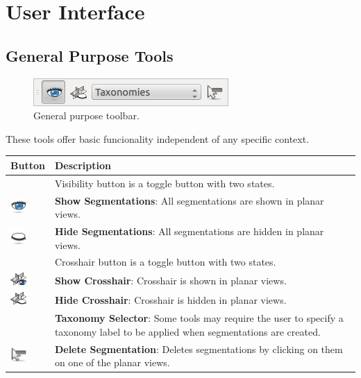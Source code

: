 \section{User Interface}

\subsection{General Purpose Tools}
\begin{figure}[H]
\centering
\includegraphics[scale=0.65]{fig/MainToolbar}
\caption{General purpose toolbar.}
\end{figure}

These tools offer basic funcionality independent of any specific context.\\

\vspace{0.3cm}
\begin{tabular}{| m{1.3cm} | m{12cm} |}
\hline
\textbf{Button} & \textbf{Description}\\
\hline
& Visibility button is a toggle button with two states.\\ 
\includegraphics[width=0.6cm]{../../frontend/rsc/show_all} &
\textbf{Show Segmentations}: All segmentations are shown in planar views.\\
\includegraphics[width=0.6cm]{../../frontend/rsc/hide_all} &
\textbf{Hide Segmentations}: All segmentations are hidden in planar views.\\
\hline
& Crosshair button is a toggle button with two states.\\ 
\includegraphics[width=0.6cm]{../../frontend/rsc/show_planes} &
\textbf{Show Crosshair}: Crosshair is shown in planar views.\\
\includegraphics[width=0.6cm]{../../frontend/rsc/hide_planes} &
\textbf{Hide Crosshair}: Crosshair is hidden in planar views.\\
\hline
 & %
\textbf{Taxonomy Selector}: Some tools may require the user to specify a
taxonomy label to be applied when segmentations are created.\\
\hline
\includegraphics[width=0.6cm]{../../frontend/rsc/removeSeg} &
\textbf{Delete Segmentation}: Deletes segmentations by clicking on them on one of the planar views.\\
\hline
\end{tabular}

